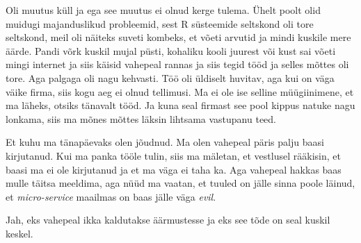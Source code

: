 Oli muutus küll ja ega see muutus ei olnud kerge tulema. Ühelt poolt olid  
muidugi majanduslikud probleemid, sest R süsteemide seltskond oli tore 
seltskond, meil oli näiteks suveti kombeks, et võeti arvutid ja mindi kuskile 
mere äärde. Pandi võrk kuskil mujal püsti, kohaliku kooli juurest  või kust sai 
võeti mingi internet ja siis käisid vahepeal rannas ja siis tegid tööd ja 
selles mõttes oli tore. Aga palgaga oli nagu kehvasti. Töö oli üldiselt 
huvitav, aga kui on väga väike firma, siis kogu aeg ei olnud tellimusi. Ma ei 
ole ise selline müügiinimene, et ma läheks, otsiks tänavalt tööd. Ja kuna seal 
firmast see pool kippus natuke nagu lonkama, siis ma mõnes mõttes läksin 
lihtsama vastupanu teed. 

Et kuhu ma tänapäevaks olen jõudnud. Ma olen vahepeal päris palju baasi 
kirjutanud. Kui ma panka tööle tulin, siis ma mäletan, et vestlusel rääkisin, 
et baasi ma ei ole kirjutanud ja et ma väga ei taha ka. Aga vahepeal hakkas 
baas mulle  täitsa meeldima, aga nüüd ma vaatan, et tuuled on jälle sinna poole 
läinud, et \emph{micro-service} maailmas on baas jälle väga \emph{evil}. 


Jah, eks vahepeal ikka kaldutakse äärmustesse ja eks see tõde on seal kuskil 
keskel.
